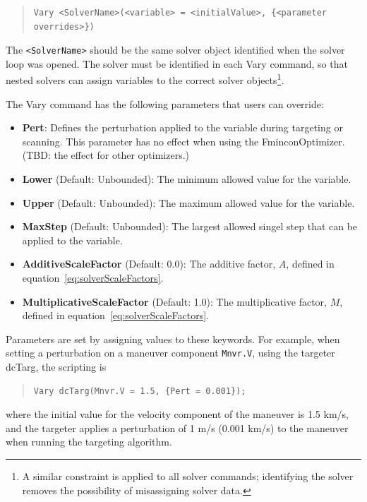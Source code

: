 \begin{quote}
\begin{verbatim}
Vary <SolverName>(<variable> = <initialValue>, {<parameter overrides>})
\end{verbatim}
\end{quote}

\noindent The \texttt{<SolverName>} should be the same solver object identified when the solver loop
was opened.  The solver must be identified in each Vary command, so that nested solvers can
assign variables to the correct solver objects\footnote{A similar constraint is applied to all
solver commands; identifying the solver removes the possibility of misassigning solver data.}.

The Vary command has the following parameters that users can override:

\begin{itemize}
\item\textbf{Pert}: Defines the perturbation applied to the variable during targeting or scanning.
This parameter has no effect when using the FminconOptimizer.  (TBD: the effect for other
optimizers.)
\item\textbf{Lower} (Default: Unbounded):  The minimum allowed value for the variable.
\item\textbf{Upper} (Default: Unbounded):  The maximum allowed value for the variable.
\item\textbf{MaxStep} (Default: Unbounded):  The largest allowed singel step that can be applied to
the variable.
\item\textbf{AdditiveScaleFactor} (Default: 0.0):  The additive factor, $A$, defined in
equation~\ref{eq:solverScaleFactors}.
\item\textbf{MultiplicativeScaleFactor} (Default: 1.0): The multiplicative factor, $M$, defined in
equation~\ref{eq:solverScaleFactors}.
\end{itemize}

\noindent Parameters are set by assigning values to these keywords.  For example, when setting
a perturbation on a maneuver component \texttt{Mnvr.V}, using the targeter dcTarg, the scripting is

\begin{quote}
\begin{verbatim}
Vary dcTarg(Mnvr.V = 1.5, {Pert = 0.001});
\end{verbatim}
\end{quote}

\noindent where the initial value for the velocity component of the maneuver is 1.5 km/s, and the
targeter applies a perturbation of 1 m/s (0.001 km/s) to the maneuver when running the targeting
algorithm.

